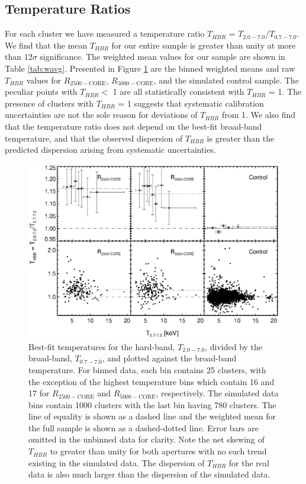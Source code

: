 \documentclass[12pt,preprint]{aastex}
\begin{document}
\subsection{Temperature Ratios} \label{sec:tfresults}

For each cluster we have measured a temperature ratio $T_{HBR}$ =
$T_{2.0-7.0}$/$T_{0.7-7.0}$. We find that the mean $T_{HBR}$ for our
entire sample is greater than unity at more than $12\sigma$
significance. The weighted mean values for our sample are shown in
Table \ref{tab:wavg}. Presented in Figure  \ref{fig:ftx} are the binned
weighted means and raw $T_{HBR}$ values for $R_{2500-\mathrm{CORE}}$,
$R_{5000-\mathrm{CORE}}$, and the simulated control sample. The peculiar
points with $T_{HBR} <$ 1 are all statistically consistent with
$T_{HBR}$ = 1. The presence of clusters with $T_{HBR}$ = 1 suggests
that systematic calibration uncertainties are not the sole reason for
deviations of $T_{HBR}$ from 1. We also find that the temperature
ratio does not depend on the best-fit broad-band temperature, and that
the observed dispersion of $T_{HBR}$ is greater than the predicted
dispersion arising from systematic uncertainties.

\begin{figure}
\begin{center}
\includegraphics*[width=\textwidth, trim=0mm 0mm 0mm 0mm, clip]{f3.eps}
\caption{
Best-fit temperatures for the hard-band, $T_{2.0-7.0}$, divided by the
broad-band, $T_{0.7-7.0}$, and plotted against the broad-band
temperature. For binned data, each bin contains 25 clusters, with the
exception of the highest temperature bins which contain 16 and 17 for
$R_{2500-\mathrm{CORE}}$ and $R_{5000-\mathrm{CORE}}$, respectively. The
simulated data bins contain 1000 clusters with the last bin having 780
clusters. The line of equality is shown as a dashed line and the
weighted mean for the full sample is shown as a dashed-dotted
line. Error bars are omitted in the unbinned data for clarity. Note
the net skewing of $T_{HBR}$ to greater than unity for both apertures
with no such trend existing in the simulated data. The dispersion of
$T_{HBR}$ for the real data is also much larger than the dispersion of
the simulated data.
}
\label{fig:ftx}
\end{center}
\end{figure}
\end{document}
